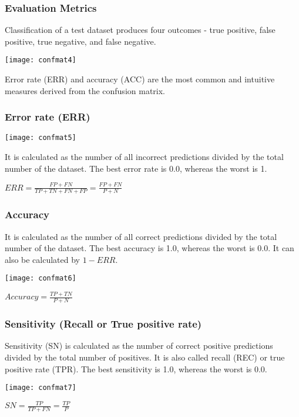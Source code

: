 \begin{frame}[fragile]\frametitle{Evaluation Metrics}
Classification of a test dataset produces four outcomes - true positive, false positive,
true negative, and false negative.
\begin{center}
\texttt{[image: confmat4]}
\end{center}
Error rate (ERR) and accuracy (ACC) are the most common and intuitive measures
derived from the confusion matrix.
\end{frame}

\begin{frame}[fragile]\frametitle{Error rate (ERR)}

\begin{center}
\texttt{[image: confmat5]}
\end{center}
It is calculated as the number of all incorrect predictions divided by
the total number of the dataset. The best error rate is 0.0, whereas the worst is 1.

$ERR = \frac{FP + FN}{TP+TN+FN+FP} = \frac{FP+FN}{P+N}$
\end{frame}

\begin{frame}[fragile]\frametitle{Accuracy}

It is calculated as the number of all  correct predictions divided by the
total number of the dataset. The best accuracy is 1.0, whereas the worst is 0.0. It can
also be calculated by $1 - ERR$.

\begin{center}
\texttt{[image: confmat6]}
\end{center}

$Accuracy = \frac{TP+TN}{P+N}$
\end{frame}


\begin{frame}[fragile]\frametitle{Sensitivity (Recall or True positive rate)}

Sensitivity (SN) is calculated as the number of correct positive predictions divided by
the total number of positives. It is also called recall (REC) or true positive rate (TPR). The best sensitivity is 1.0, whereas the worst is 0.0.

\begin{center}
\texttt{[image: confmat7]}
\end{center}

$SN = \frac{TP}{TP+FN} = \frac{TP}{P}$
\end{frame}

